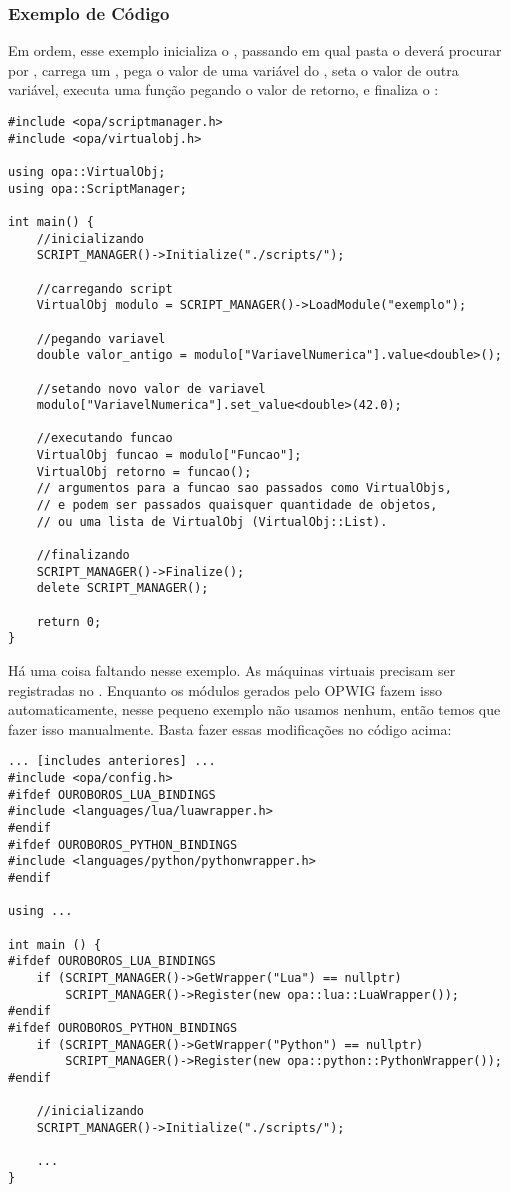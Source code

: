 \subsubsection{Exemplo de Código} 
Em ordem, esse exemplo inicializa o \SMgr{}, passando em qual pasta
o \SMgr{} deverá procurar por , carrega um \script{},
pega o valor de uma variável do \script{}, seta o valor de outra variável, 
executa uma função pegando o valor de retorno, e finaliza o \SMgr{}:
    
\begin{lstlisting}
#include <opa/scriptmanager.h>
#include <opa/virtualobj.h>

using opa::VirtualObj;
using opa::ScriptManager;

int main() {
    //inicializando
    SCRIPT_MANAGER()->Initialize("./scripts/");
    
    //carregando script
    VirtualObj modulo = SCRIPT_MANAGER()->LoadModule("exemplo");
    
    //pegando variavel
    double valor_antigo = modulo["VariavelNumerica"].value<double>();
    
    //setando novo valor de variavel
    modulo["VariavelNumerica"].set_value<double>(42.0);
    
    //executando funcao
    VirtualObj funcao = modulo["Funcao"];
    VirtualObj retorno = funcao(); 
    // argumentos para a funcao sao passados como VirtualObjs, 
    // e podem ser passados quaisquer quantidade de objetos,
    // ou uma lista de VirtualObj (VirtualObj::List).
    
    //finalizando
    SCRIPT_MANAGER()->Finalize();
    delete SCRIPT_MANAGER();
    
    return 0;
}
\end{lstlisting}

Há uma coisa faltando nesse exemplo. As máquinas virtuais precisam ser registradas no \SMgr{}.
Enquanto os módulos gerados pelo OPWIG fazem isso automaticamente, nesse pequeno exemplo não
usamos nenhum, então temos que fazer isso manualmente. Basta fazer essas modificações no código acima:

\begin{lstlisting}
... [includes anteriores] ...
#include <opa/config.h>
#ifdef OUROBOROS_LUA_BINDINGS
#include <languages/lua/luawrapper.h>
#endif
#ifdef OUROBOROS_PYTHON_BINDINGS
#include <languages/python/pythonwrapper.h>
#endif

using ...

int main () {
#ifdef OUROBOROS_LUA_BINDINGS
    if (SCRIPT_MANAGER()->GetWrapper("Lua") == nullptr)
        SCRIPT_MANAGER()->Register(new opa::lua::LuaWrapper());    
#endif
#ifdef OUROBOROS_PYTHON_BINDINGS
    if (SCRIPT_MANAGER()->GetWrapper("Python") == nullptr)
        SCRIPT_MANAGER()->Register(new opa::python::PythonWrapper());
#endif

    //inicializando
    SCRIPT_MANAGER()->Initialize("./scripts/");
    
    ...
}
\end{lstlisting}

